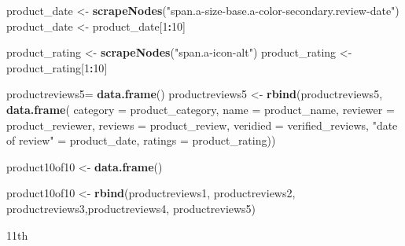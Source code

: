 \documentclass[
]{article}
\newenvironment{Shaded}{\begin{snugshade}}{\end{snugshade}}
\newcommand{\AttributeTok}[1]{\textcolor[rgb]{0.13,0.29,0.53}{#1}}
\newcommand{\DecValTok}[1]{\textcolor[rgb]{0.00,0.00,0.81}{#1}}
\newcommand{\FunctionTok}[1]{\textcolor[rgb]{0.13,0.29,0.53}{\textbf{#1}}}
\newcommand{\NormalTok}[1]{#1}
\newcommand{\OtherTok}[1]{\textcolor[rgb]{0.56,0.35,0.01}{#1}}
\newcommand{\SpecialCharTok}[1]{\textcolor[rgb]{0.81,0.36,0.00}{\textbf{#1}}}
\newcommand{\StringTok}[1]{\textcolor[rgb]{0.31,0.60,0.02}{#1}}
\begin{document}
\begin{Shaded}
\begin{Highlighting}[]
\NormalTok{  product\_date }\OtherTok{\textless{}{-}} \FunctionTok{scrapeNodes}\NormalTok{(}\StringTok{"span.a{-}size{-}base.a{-}color{-}secondary.review{-}date"}\NormalTok{)}
\NormalTok{  product\_date }\OtherTok{\textless{}{-}}\NormalTok{ product\_date[}\DecValTok{1}\SpecialCharTok{:}\DecValTok{10}\NormalTok{]}
  
\NormalTok{  product\_rating }\OtherTok{\textless{}{-}} \FunctionTok{scrapeNodes}\NormalTok{(}\StringTok{"span.a{-}icon{-}alt"}\NormalTok{)}
\NormalTok{  product\_rating }\OtherTok{\textless{}{-}}\NormalTok{ product\_rating[}\DecValTok{1}\SpecialCharTok{:}\DecValTok{10}\NormalTok{]}
  
\NormalTok{  productreviews5}\OtherTok{=} \FunctionTok{data.frame}\NormalTok{()}
\NormalTok{  productreviews5 }\OtherTok{\textless{}{-}} \FunctionTok{rbind}\NormalTok{(productreviews5, }\FunctionTok{data.frame}\NormalTok{(}
                      \AttributeTok{category =}\NormalTok{ product\_category,}
                      \AttributeTok{name =}\NormalTok{ product\_name,}
                      \AttributeTok{reviewer =}\NormalTok{ product\_reviewer,}
                      \AttributeTok{reviews =}\NormalTok{ product\_review,}
                      \AttributeTok{veridied =}\NormalTok{ verified\_reviews,}
                      \StringTok{"date of review"} \OtherTok{=}\NormalTok{ product\_date,}
                      \AttributeTok{ratings =}\NormalTok{ product\_rating))}
  
  
  
\NormalTok{  product10of10 }\OtherTok{\textless{}{-}} \FunctionTok{data.frame}\NormalTok{()}
  
\NormalTok{  product10of10 }\OtherTok{\textless{}{-}} \FunctionTok{rbind}\NormalTok{(productreviews1, productreviews2, productreviews3,productreviews4, productreviews5)}
\end{Highlighting}
\end{Shaded}

11th
\end{document}
